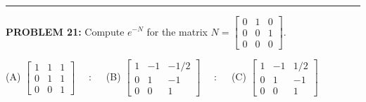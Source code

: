 \documentclass[12pt]{amsart}
\newcommand{\divider}{
  \vspace{-1em} %
  \noindent
  \raisebox{-0.15ex}{\textbullet}%
  \hspace{0.5em}%
  \rule[0.5ex]{0.95\textwidth}{1.0pt}%
  \hspace{0.5em}%
  \raisebox{-0.15ex}{\textbullet}%
  \vspace{0em} %
}
\begin{document}

\divider

{\bf PROBLEM 21:}
Compute $e^{-N}$ for the matrix
$N = \begin{bmatrix} 0 & 1 & 0 \\ 0 & 0 & 1 \\ 0 & 0 & 0 \end{bmatrix}.$


\bigskip

(A) $\begin{bmatrix} 1 & 1 & 1 \\ 0 & 1 & 1 \\ 0 & 0 & 1 \end{bmatrix}$
$\quad : \quad$
(B) $\begin{bmatrix} 1 & -1 & -1/2 \\ 0 & 1 & -1 \\ 0 & 0 & 1 \end{bmatrix}$
$\quad : \quad$
(C) $\begin{bmatrix} 1 & -1 & 1/2 \\ 0 & 1 & -1 \\ 0 & 0 & 1 \end{bmatrix}$
\end{document}
